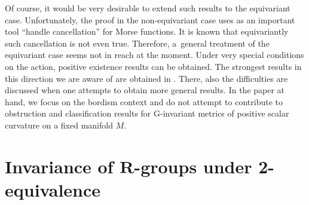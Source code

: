 \documentclass[11pt]{article}
\numberwithin{equation}{section}
\numberwithin{equation}{section}
\begin{document}
	Of course, it would be very desirable to extend such results to the
	equivariant case. Unfortunately, the proof in the non-equivariant case uses as
	an important tool ``handle cancellation'' for Morse functions. It is known
	that equivariantly such cancellation is not even true. Therefore, a~general
	treatment of the equivariant case seems not in reach at the moment. Under very
	special conditions on the action, positive existence results can be
	obtained. The strongest results in this direction we are aware of are obtained
	in \cite{Hanke}. There, also the difficulties are discussed when one attempts
	to obtain more general results. In the paper at hand, we focus on the bordism
	context and do not attempt to contribute to obstruction and classification
	results for G-invariant metrics of positive scalar curvature on a fixed
	manifold $M$.
	
\section[Invariance of R-groups under 2-equivalence]{Invariance of $\boldsymbol{R}$-groups under 2-equivalence}
	
\end{document}
